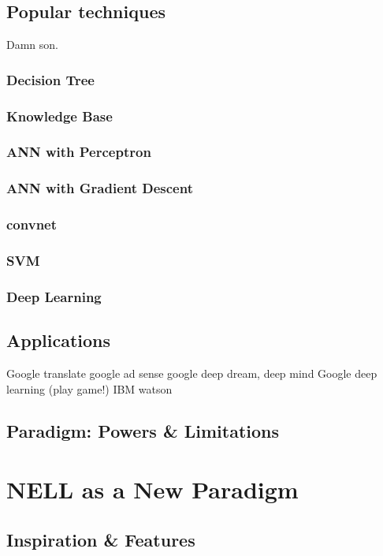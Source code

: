 \documentclass[12pt]{article}  %
\begin{document}
\subsection{Popular techniques}
Damn son.
\subsubsection{Decision Tree}
\subsubsection{Knowledge Base}
\subsubsection{ANN with Perceptron}
\subsubsection{ANN with Gradient Descent}
\subsubsection{convnet}
\subsubsection{SVM}
\subsubsection{Deep Learning}

\subsection{Applications}
Google translate
google ad sense
google deep dream, deep mind
Google deep learning (play game!)
IBM watson


\subsection{Paradigm: Powers \& Limitations}



\section{NELL as a New Paradigm}

\subsection{Inspiration \& Features}
\end{document}
